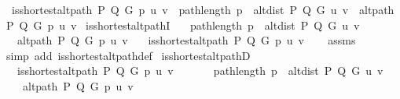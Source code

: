 \begin{isabellebody}
\ \ {\isachardoublequoteopen}is{\isacharunderscore}{\kern0pt}shortest{\isacharunderscore}{\kern0pt}alt{\isacharunderscore}{\kern0pt}path\ P\ Q\ G\ p\ u\ v\ {\isasymequiv}\ path{\isacharunderscore}{\kern0pt}length\ p\ {\isacharequal}{\kern0pt}\ alt{\isacharunderscore}{\kern0pt}dist\ P\ Q\ G\ u\ v\ {\isasymand}\ alt{\isacharunderscore}{\kern0pt}path\ P\ Q\ G\ p\ u\ v{\isachardoublequoteclose}\isanewline
%
\isadeliminvisible
\isanewline
%
\endisadeliminvisible
%
\isataginvisible
{}\isamarkupfalse%
\ is{\isacharunderscore}{\kern0pt}shortest{\isacharunderscore}{\kern0pt}alt{\isacharunderscore}{\kern0pt}pathI{\isacharcolon}{\kern0pt}\isanewline
\ \ \ {\isachardoublequoteopen}path{\isacharunderscore}{\kern0pt}length\ p\ {\isacharequal}{\kern0pt}\ alt{\isacharunderscore}{\kern0pt}dist\ P\ Q\ G\ u\ v{\isachardoublequoteclose}\isanewline
\ \ \ {\isachardoublequoteopen}alt{\isacharunderscore}{\kern0pt}path\ P\ Q\ G\ p\ u\ v{\isachardoublequoteclose}\isanewline
\ \ \ {\isachardoublequoteopen}is{\isacharunderscore}{\kern0pt}shortest{\isacharunderscore}{\kern0pt}alt{\isacharunderscore}{\kern0pt}path\ P\ Q\ G\ p\ u\ v{\isachardoublequoteclose}%
\endisataginvisible
{\isafoldinvisible}%
%
\isadeliminvisible
\isanewline
%
\endisadeliminvisible
%
\isadelimproof
\ \ %
\endisadelimproof
%
\isatagproof
{}\isamarkupfalse%
\ assms\isanewline
\ \ \isamarkupfalse%
\ {\isacharparenleft}{\kern0pt}simp\ add{\isacharcolon}{\kern0pt}\ is{\isacharunderscore}{\kern0pt}shortest{\isacharunderscore}{\kern0pt}alt{\isacharunderscore}{\kern0pt}path{\isacharunderscore}{\kern0pt}def{\isacharparenright}{\kern0pt}%
\endisatagproof
{\isafoldproof}%
%
\isadelimproof
\isanewline
%
\endisadelimproof
%
\isadeliminvisible
\isanewline
%
\endisadeliminvisible
%
\isataginvisible
{}\isamarkupfalse%
\ is{\isacharunderscore}{\kern0pt}shortest{\isacharunderscore}{\kern0pt}alt{\isacharunderscore}{\kern0pt}pathD{\isacharcolon}{\kern0pt}\isanewline
\ \ \ {\isachardoublequoteopen}is{\isacharunderscore}{\kern0pt}shortest{\isacharunderscore}{\kern0pt}alt{\isacharunderscore}{\kern0pt}path\ P\ Q\ G\ p\ u\ v{\isachardoublequoteclose}\isanewline
\ \ \isanewline
\ \ \ \ {\isachardoublequoteopen}path{\isacharunderscore}{\kern0pt}length\ p\ {\isacharequal}{\kern0pt}\ alt{\isacharunderscore}{\kern0pt}dist\ P\ Q\ G\ u\ v{\isachardoublequoteclose}\isanewline
\ \ \ \ {\isachardoublequoteopen}alt{\isacharunderscore}{\kern0pt}path\ P\ Q\ G\ p\ u\ v{\isachardoublequoteclose}%

\end{isabellebody}
